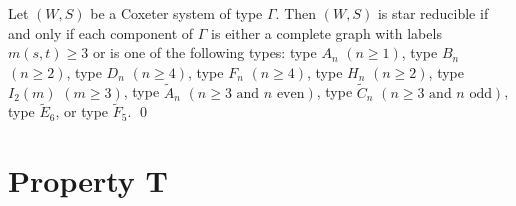 \begin{proposition}\label{prop:starredcoxgrp}
	Let $(W,S)$ be a Coxeter system of type $\Gamma$. Then $(W,S)$ is star reducible if and only if each component of $\Gamma$ is either a complete graph with labels $m(s,t)\geq 3$ or is one of the following types: type $A_n$ $(n \geq 1)$, type $B_n$ $(n \geq 2)$, type $D_n$ $(n \geq 4)$, type $F_n$ $(n \geq 4)$, type $H_n$ $(n \geq 2)$, type $I_2(m)$ $(m \geq 3)$, type $\widetilde{A}_{n}$ $(n \geq 3 \textrm{ and } n \textrm{ even})$, type $\widetilde{C}_{n}$ $(n\geq 3 \textrm{ and } n \textrm{ odd})$, type $\widetilde{E}_6$, or type $\widetilde{F}_5$. \qed
\end{proposition}    


\section{Property T}\label{sec:Tavoid}

